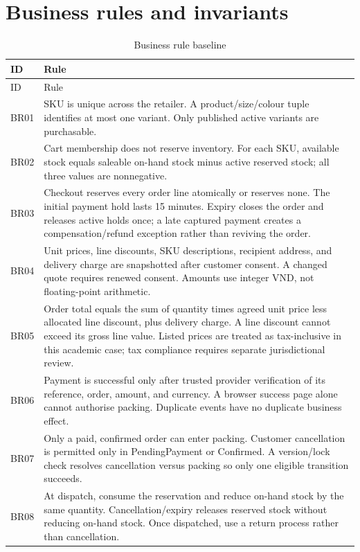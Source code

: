 \section{Business rules and invariants}
\begin{longtable}{P{.1\linewidth}P{.8\linewidth}}
\caption{Business rule baseline}\label{tab:rules}\\
\toprule ID & Rule \\\midrule\endfirsthead
\toprule ID & Rule \\\midrule\endhead
BR01 & SKU is unique across the retailer. A product/size/colour tuple identifies at most one variant. Only published active variants are purchasable.\\
BR02 & Cart membership does not reserve inventory. For each SKU, available stock equals saleable on-hand stock minus active reserved stock; all three values are nonnegative.\\
BR03 & Checkout reserves every order line atomically or reserves none. The initial payment hold lasts 15 minutes. Expiry closes the order and releases active holds once; a late captured payment creates a compensation/refund exception rather than reviving the order.\\
BR04 & Unit prices, line discounts, SKU descriptions, recipient address, and delivery charge are snapshotted after customer consent. A changed quote requires renewed consent. Amounts use integer VND, not floating-point arithmetic.\\
BR05 & Order total equals the sum of quantity times agreed unit price less allocated line discount, plus delivery charge. A line discount cannot exceed its gross line value. Listed prices are treated as tax-inclusive in this academic case; tax compliance requires separate jurisdictional review.\\
BR06 & Payment is successful only after trusted provider verification of its reference, order, amount, and currency. A browser success page alone cannot authorise packing. Duplicate events have no duplicate business effect.\\
BR07 & Only a paid, confirmed order can enter packing. Customer cancellation is permitted only in PendingPayment or Confirmed. A version/lock check resolves cancellation versus packing so only one eligible transition succeeds.\\
BR08 & At dispatch, consume the reservation and reduce on-hand stock by the same quantity. Cancellation/expiry releases reserved stock without reducing on-hand stock. Once dispatched, use a return process rather than cancellation.\\

\end{longtable}
